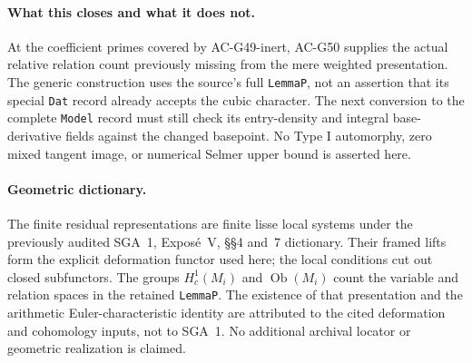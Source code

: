 \paragraph{What this closes and what it does not.}
At the coefficient primes covered by AC-G49-inert,
AC-G50 supplies the actual relative relation count
previously missing from the mere weighted presentation.
The generic construction uses the source's full
\texttt{LemmaP}, not an assertion that its special
\texttt{Dat} record already accepts the cubic character.
The next conversion to the complete \texttt{Model}
record must still check its entry-density and integral
base-derivative fields against the changed basepoint.
No Type I automorphy, zero mixed tangent image, or numerical
Selmer upper bound is asserted here.

\paragraph{Geometric dictionary.}
The finite residual representations are finite lisse local
systems under the previously audited SGA~1, Expos\'e~V,
\S\S4 and~7 dictionary.  Their framed lifts form the
explicit deformation functor used here; the local conditions
cut out closed subfunctors.  The groups $H^1_c(M_i)$ and
$\operatorname{Ob}(M_i)$ count the variable and relation
spaces in the retained \texttt{LemmaP}.  The existence of
that presentation and the arithmetic Euler-characteristic
identity are attributed to the cited deformation and
cohomology inputs, not to SGA~1.  No additional archival
locator or geometric realization is claimed.
